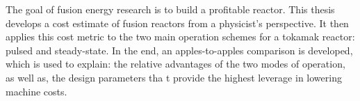 % 
% 
%
The goal of fusion energy research is to build a profitable reactor. This thesis develops a cost estimate of fusion reactors from a physicist's perspective. It then applies this cost metric to the two main operation schemes for a tokamak reactor: pulsed and steady-state. In the end, an apples-to-apples comparison is developed, which is used to explain: the relative advantages of the two modes of operation, as well as, the design parameters tha
t provide the highest leverage in lowering machine costs.
